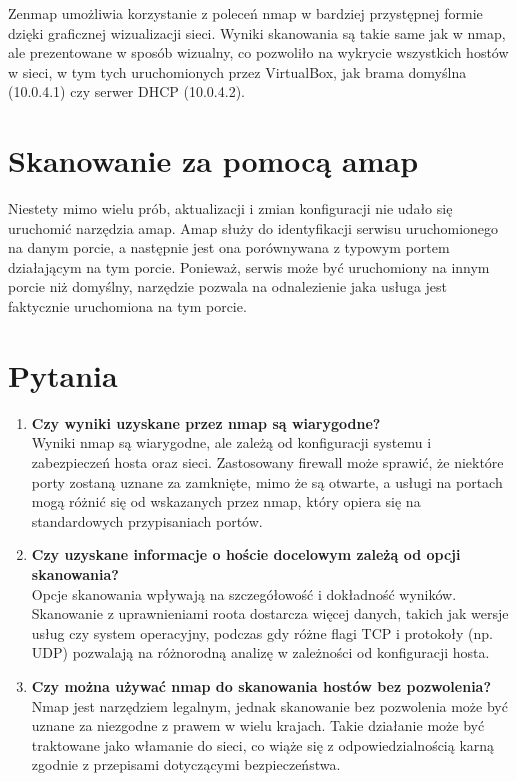 \documentclass{article}
\begin{document}
Zenmap umożliwia korzystanie z poleceń nmap w bardziej przystępnej formie dzięki graficznej wizualizacji sieci. Wyniki skanowania są takie same jak w nmap, ale prezentowane w sposób wizualny, co pozwoliło na wykrycie wszystkich hostów w sieci, w tym tych uruchomionych przez VirtualBox, jak brama domyślna (10.0.4.1) czy serwer DHCP (10.0.4.2).
\section*{Skanowanie za pomocą amap}
Niestety mimo wielu prób, aktualizacji i zmian konfiguracji nie udało się uruchomić narzędzia amap.
Amap służy do identyfikacji serwisu uruchomionego na danym porcie, a następnie jest ona porównywana z typowym portem działającym na tym porcie. Ponieważ, serwis może być uruchomiony na innym porcie niż domyślny, narzędzie
pozwala na odnalezienie jaka usługa jest faktycznie uruchomiona na tym porcie.

\section*{Pytania}

\begin{enumerate}
  \item \textbf{Czy wyniki uzyskane przez nmap są wiarygodne?} \\
        Wyniki nmap są wiarygodne, ale zależą od konfiguracji systemu i zabezpieczeń hosta oraz sieci. Zastosowany firewall może sprawić, że niektóre porty zostaną uznane za zamknięte, mimo że są otwarte, a usługi na portach mogą różnić się od wskazanych przez nmap, który opiera się na standardowych przypisaniach portów.

  \item \textbf{Czy uzyskane informacje o hoście docelowym zależą od opcji skanowania?} \\
        Opcje skanowania wpływają na szczegółowość i dokładność wyników. Skanowanie z uprawnieniami roota dostarcza więcej danych, takich jak wersje usług czy system operacyjny, podczas gdy różne flagi TCP i protokoły (np. UDP) pozwalają na różnorodną analizę w zależności od konfiguracji hosta.

  \item \textbf{Czy można używać nmap do skanowania hostów bez pozwolenia?} \\
        Nmap jest narzędziem legalnym, jednak skanowanie bez pozwolenia może być uznane za niezgodne z prawem w wielu krajach. Takie działanie może być traktowane jako włamanie do sieci, co wiąże się z odpowiedzialnością karną zgodnie z przepisami dotyczącymi bezpieczeństwa.
\end{enumerate}
\end{document}

